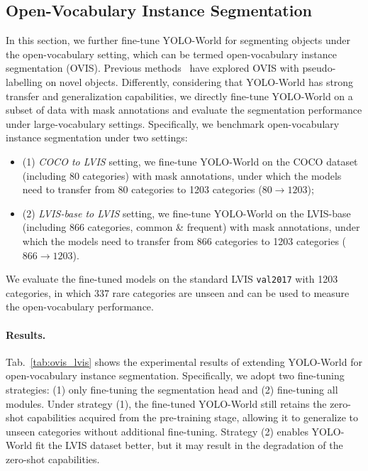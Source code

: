 \documentclass[10pt,twocolumn,letterpaper]{article}
\newcommand{\name}{YOLO-World}
\begin{document}
\subsection{Open-Vocabulary Instance Segmentation}
\label{ovis}
In this section, we further fine-tune \name{} for segmenting objects under the open-vocabulary setting, which can be termed open-vocabulary instance segmentation (OVIS).
Previous methods~\cite{OVIS} have explored OVIS with pseudo-labelling on novel objects.
Differently, considering that \name{} has strong transfer and generalization capabilities, we directly fine-tune \name{} on a subset of data with mask annotations and evaluate the segmentation performance under large-vocabulary settings.
Specifically, we benchmark open-vocabulary instance segmentation under two settings:
\begin{itemize}
    \item (1) \textit{COCO to LVIS} setting, we fine-tune \name{} on the COCO dataset (including 80 categories) with mask annotations, under which the models need to transfer from 80 categories to 1203 categories ($80\rightarrow{}1203$);
    \item (2) \textit{LVIS-base to LVIS} setting, we fine-tune \name{} on the LVIS-base (including 866 categories, common \& frequent) with mask annotations, under which the models need to transfer from 866 categories to 1203 categories ($866\rightarrow{}1203$).
\end{itemize}
We evaluate the fine-tuned models on the standard LVIS \texttt{val2017} with 1203 categories, in which 337 rare categories are unseen and can be used to measure the open-vocabulary performance.

\paragraph{Results.}
Tab.~\ref{tab:ovis_lvis} shows the experimental results of extending \name{} for open-vocabulary instance segmentation.
Specifically, we adopt two fine-tuning strategies: (1) only fine-tuning the segmentation head and (2) fine-tuning all modules.
Under strategy (1), the fine-tuned \name{} still retains the zero-shot capabilities acquired from the pre-training stage, allowing it to generalize to unseen categories without additional fine-tuning. 
Strategy (2) enables \name{} fit the LVIS dataset better, but it may result in the degradation of the zero-shot capabilities.
\end{document}
